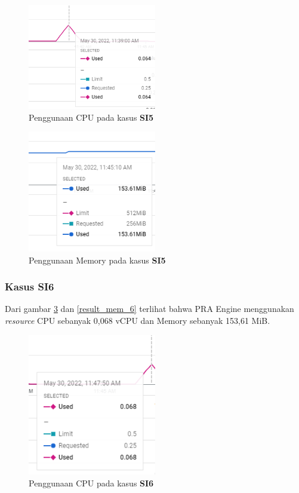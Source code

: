 \begin{figure}[!htb]
	\centering
	\includegraphics[width=0.5\textwidth]{resources/ch4/resource/5-cpu.png}
	\caption{Penggunaan CPU pada kasus \textbf{SI5}}
	\label{result_cpu_5}
\end{figure}

\begin{figure}[!htb]
	\centering
	\includegraphics[width=0.5\textwidth]{resources/ch4/resource/5-mem.png}
	\caption{Penggunaan Memory pada kasus \textbf{SI5}}
	\label{result_mem_5}
\end{figure}

\pagebreak

\subsubsection{Kasus SI6}
Dari gambar \ref{result_cpu_6} dan \ref{result_mem_6} terlihat bahwa PRA Engine menggunakan \textit{resource} CPU sebanyak 0,068 vCPU dan Memory sebanyak 153,61 MiB. 

\begin{figure}[!htb]
	\centering
	\includegraphics[width=0.5\textwidth]{resources/ch4/resource/6-cpu.png}
	\caption{Penggunaan CPU pada kasus \textbf{SI6}}
	\label{result_cpu_6}
\end{figure}

